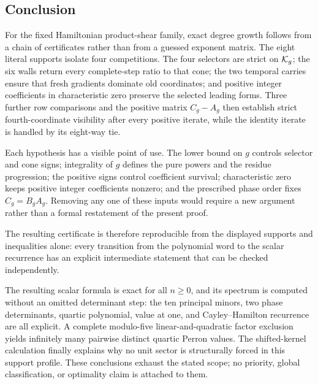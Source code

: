 \documentclass[11pt]{article}
\theoremstyle{remark}
\numberwithin{equation}{section}
\begin{document}
\subsection{Conclusion}

For the fixed Hamiltonian product-shear family, exact degree growth follows
from a chain of certificates rather than from a guessed exponent matrix.
The eight literal supports isolate four competitions.  The four selectors
are strict on \(\mathcal{K}_g\); the six walls return every complete-step ratio to
that cone; the two temporal carries ensure that fresh gradients dominate
old coordinates; and positive integer coefficients in characteristic zero
preserve the selected leading forms.  Three further row comparisons and
the positive matrix \(C_g-A_g\) then establish strict fourth-coordinate
visibility after every positive iterate, while the identity iterate is
handled by its eight-way tie.

Each hypothesis has a visible point of use.  The lower bound on \(g\)
controls selector and cone signs; integrality of \(g\) defines the pure
powers and the residue progression; the positive signs control
coefficient survival; characteristic zero keeps positive integer
coefficients nonzero; and the prescribed phase order fixes \(C_g=B_gA_g\).
Removing any one of these inputs would require a new argument rather than a
formal restatement of the present proof.

The resulting certificate is therefore reproducible from the displayed
supports and inequalities alone: every transition from the polynomial word
to the scalar recurrence has an explicit intermediate statement that can
be checked independently.

The resulting scalar formula is exact for all \(n\geq0\), and its spectrum
is computed without an omitted determinant step: the ten principal minors,
two phase determinants, quartic polynomial, value at one, and
Cayley--Hamilton recurrence are all explicit.  A complete modulo-five
linear-and-quadratic factor exclusion yields infinitely many pairwise
distinct quartic Perron values.  The shifted-kernel calculation finally
explains why no unit sector is structurally forced in this support profile.
These conclusions exhaust the stated scope; no priority, global
classification, or optimality claim is attached to them.



\end{document}
